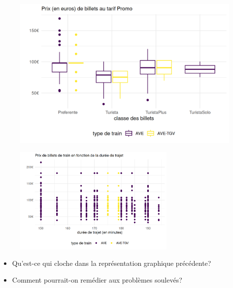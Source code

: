 \documentclass[
  ignorenonframetext,
]{beamer}
\providecommand{\tightlist}{%
  \setlength{\itemsep}{0pt}\setlength{\parskip}{0pt}}\usepackage{longtable,booktabs,array}
\begin{document}
\begin{frame}
\begin{figure}

{\centering \includegraphics[width=1\textwidth,height=\textheight]{MATH60602-diapos1_files/figure-beamer/renfe_boxplot-1.png}

}

\end{figure}
\end{frame}

\begin{frame}
\begin{figure}

{\centering \includegraphics[width=0.7\textwidth,height=\textheight]{MATH60602-diapos1_files/figure-beamer/renfe_nuagepts_code-1.png}

}

\end{figure}

\begin{itemize}
\tightlist
\item
  Qu'est-ce qui cloche dans la représentation graphique précédente?
\item
  Comment pourrait-on remédier aux problèmes soulevés?
\end{itemize}
\end{frame}
\end{document}
